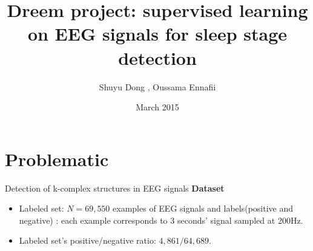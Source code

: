 \documentclass{beamer}
\title{\textbf{Dreem project: supervised learning on EEG signals for sleep stage detection }\\}%
\author{Shuyu Dong , Oussama Ennafii}
\institute[Telecom Paris, MVA] %
{
  MVA project\\
  
  \vspace{1cm}
  
  
   }
\date{March 2015}
\begin{document}
\frame{\maketitle}

\section{ Problematic }
\begin{frame}{ Detection of k-complex structures in EEG signals }{}
 \textbf{ Dataset } \\
   \begin{itemize}
   \item { Labeled set: $N = 69,550$ examples of EEG signals and labels(positive and negative) : each example corresponds to 3 seconds' signal sampled at 200Hz.
   }
   \item { Labeled set's positive/negative ratio: $4,861 / 64,689 $. 
   } 
       \end{itemize}
       \begin{figure}[H]
\centering
{}
\label{fig:orig}
\end{figure} 

\end{frame}
\end{document}
